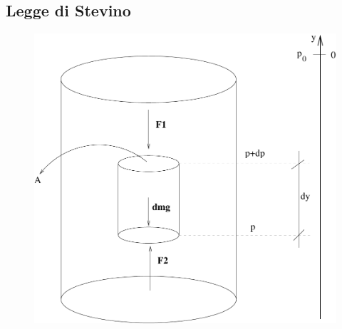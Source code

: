 \subsection{Legge di Stevino}
\label{stevino11}
\begin{figure}[htbp]
\centering
\includegraphics[scale=0.4]{immagini/fisica1/legge_di_stevino1}
\end{figure}


